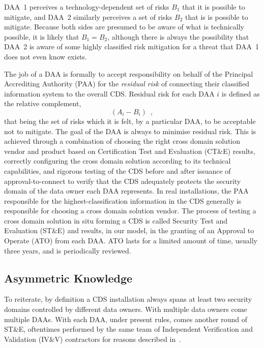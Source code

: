 \documentclass{llncs}
\begin{document}
DAA~1 perceives a technology-dependent set of risks $B_1$ that it is
possible to mitigate, and DAA~2 similarly perceives a set of risks $B_2$
that is is possible to mitigate.
Because both sides are presumed to be aware of what is technically
possible, it is likely that $B_1 = B_2$, although there is always the
possibility that DAA~2 is aware of some highly classified risk mitigation
for a threat that DAA~1 does not even know exists.

The job of a DAA
is formally to accept responsibility on behalf of the Principal Accrediting
Authority (PAA) for the \emph{residual risk} of connecting their classified information system
to the overall CDS.  Residual risk for each DAA $i$ is defined as the relative complement,
\begin{equation}\label{equation:individual-residual-risk}
\left(A_i-B_i\right)\enspace,
\end{equation}
that being the set of risks which it is felt, by a particular DAA,
to be acceptable not to mitigate.  The goal of the DAA is always to minimise residual risk.
This is achieved through a combination of choosing the right cross domain solution
vendor and product based on Certification Test and Evaluation (CT\&E) results,
correctly configuring the cross domain solution according
to its technical capabilities, and rigorous testing of the CDS before and
after issuance of approval-to-connect to verify that the CDS adequately protects
the security domain of the data owner each DAA represents.  In real installations,
the PAA responsible for the highest-classification information in the CDS generally is
responsible for choosing a cross domain solution vendor.  The process of testing a
cross domain solution in situ forming a CDS
is called Security Test and Evaluation (ST\&E) and results,
in our model, in the granting of an Approval
to Operate (ATO) from each DAA.  ATO lasts for a limited amount
of time, usually three years, and is periodically reviewed.

\subsection{Asymmetric Knowledge}

To reiterate, by definition a CDS installation always
spans at least two security domains controlled by different data owners.
With multiple data owners come multiple DAAs.  With each DAA, under present rules, comes
another round of ST\&E, oftentimes performed by the same team of Independent
Verification and Validation (IV\&V) contractors for reasons
described in~\cite{Loughry2010a}.
\end{document}
